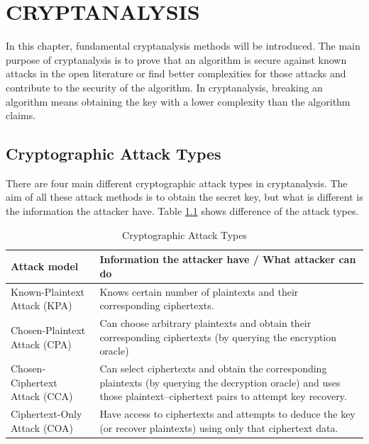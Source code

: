\chapter{CRYPTANALYSIS}\label{ch:cyptanalysis}

\vspace{-12pt} %
In this chapter, fundamental cryptanalysis methods will be introduced. The main purpose of cryptanalysis is to prove that an algorithm is secure against known attacks in the open literature or  find better complexities for those attacks and contribute to the security of the algorithm. In cryptanalysis, breaking an algorithm means obtaining the key with a lower complexity than the algorithm claims.

\section{Cryptographic Attack Types}
There are four main different cryptographic attack types in cryptanalysis. The aim of all these attack methods is to obtain the secret key, but what is different is the information the attacker have. Table \ref{tab:attack-types} shows difference of the attack types.

\begin{table}[h!]
\centering
\caption{Cryptographic Attack Types}
\begin{tabular}{|l|p{}|}
\hhline{|=|=|}
\textbf{Attack model} & \textbf{Information the attacker have / What attacker can do} \\ \hline
Known-Plaintext Attack (KPA) &
Knows certain number of plaintexts and their corresponding ciphertexts. \\ \hline
Chosen-Plaintext Attack (CPA) &
Can choose arbitrary plaintexts and obtain their corresponding ciphertexts (by querying the encryption oracle)  \\ \hline
Chosen-Ciphertext Attack (CCA) &
Can select ciphertexts and obtain the corresponding plaintexts (by querying the decryption oracle) and uses those plaintext–ciphertext pairs to attempt key recovery. \\ \hline
Ciphertext-Only Attack (COA) &
Have access to ciphertexts and attempts to deduce the key (or recover plaintexts) using only that ciphertext data. \\ \hline
\end{tabular}

\label{tab:attack-types}
\end{table}

